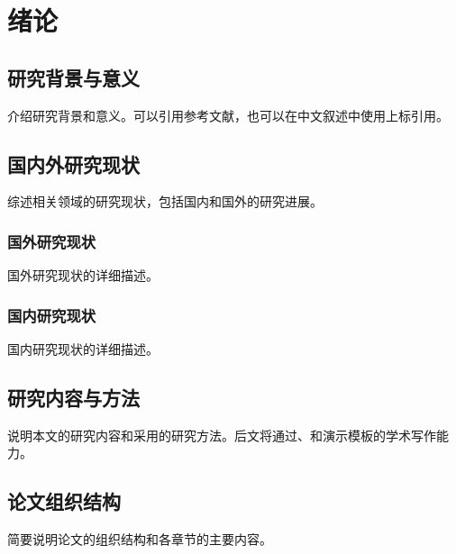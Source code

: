 \chapter{绪论}


\section{研究背景与意义}

介绍研究背景和意义。可以引用参考文献\cite{example2026}，也可以在中文叙述中使用上标引用。

\section{国内外研究现状}

综述相关领域的研究现状，包括国内和国外的研究进展。

\subsection{国外研究现状}

国外研究现状的详细描述。

\subsection{国内研究现状}

国内研究现状的详细描述。

\section{研究内容与方法}

说明本文的研究内容和采用的研究方法。后文将通过、和演示模板的学术写作能力。

\section{论文组织结构}

简要说明论文的组织结构和各章节的主要内容。
